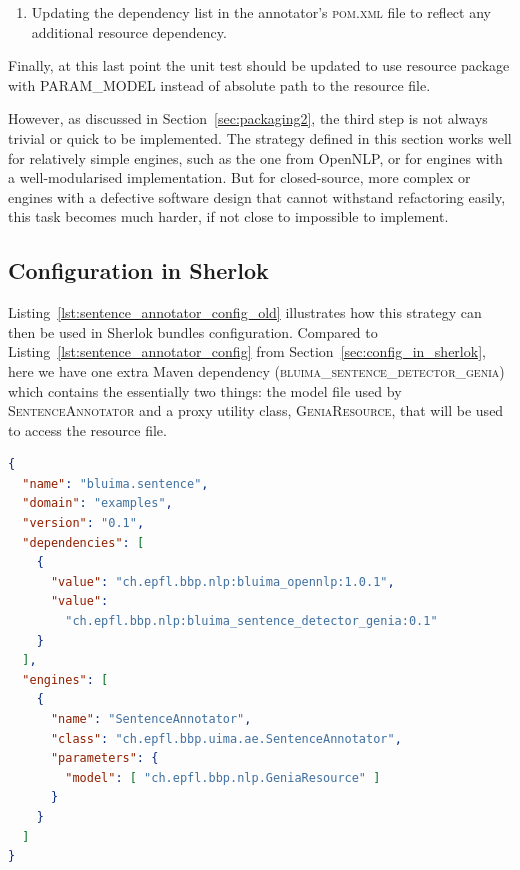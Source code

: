 \documentclass{article}
\newcommand{\ID}[1]{{\textsc{#1}}}
\begin{document}
\begin{appendices}
\begin{enumerate}
    \item Updating the dependency list in the annotator's \ID{pom.xml} file to reflect any additional
        resource dependency.

\end{enumerate}

Finally, at this last point the unit test should be updated to use resource package with
\ID{PARAM\_MODEL} instead of absolute path to the resource file.

However, as discussed in Section~\ref{sec:packaging2}, the third step is not always trivial or quick
to be implemented. The strategy defined in this section works well for relatively simple engines,
such as the one from OpenNLP, or for engines with a well-modularised implementation. But for
closed-source, more complex or engines with a defective software design that cannot withstand
refactoring easily, this task becomes much harder, if not close to impossible to implement.

\subsection{Configuration in Sherlok}

Listing~\ref{lst:sentence_annotator_config_old} illustrates how this strategy can then be used in
Sherlok bundles configuration. Compared to Listing~\ref{lst:sentence_annotator_config} from
Section~\ref{sec:config_in_sherlok}, here we have one extra Maven dependency
(\ID{bluima\_sentence\_detector\_genia}) which contains the essentially two things: the model file used
by \ID{SentenceAnnotator} and a proxy utility class, \ID{GeniaResource}, that will be used to access
the resource file.

\begin{lstlisting}[float,language=json,
                   caption=Configuration of \ID{SentenceAnnotator} in a Sherlok bundle with the
                   proxy-based packaging strategy,
                   label=lst:sentence_annotator_config_old]
{
  "name": "bluima.sentence",
  "domain": "examples",
  "version": "0.1",
  "dependencies": [
    {
      "value": "ch.epfl.bbp.nlp:bluima_opennlp:1.0.1",
      "value":
        "ch.epfl.bbp.nlp:bluima_sentence_detector_genia:0.1"
    }
  ],
  "engines": [
    {
      "name": "SentenceAnnotator",
      "class": "ch.epfl.bbp.uima.ae.SentenceAnnotator",
      "parameters": {
        "model": [ "ch.epfl.bbp.nlp.GeniaResource" ]
      }
    }
  ]
}
\end{lstlisting}

\end{appendices}
\end{document}
